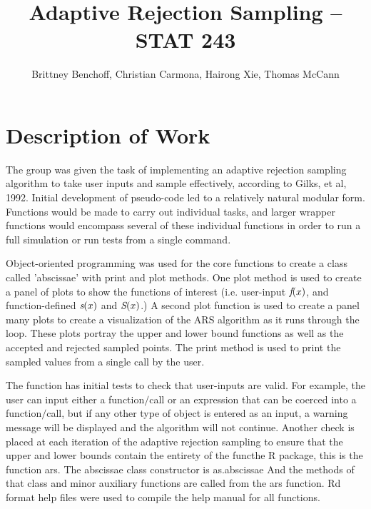 \documentclass{article}\usepackage[]{graphicx}\usepackage[]{color}
\begin{document}
\pagestyle{fancy}



\title{Adaptive Rejection Sampling -- STAT 243}
\author{Brittney Benchoff, Christian Carmona, Hairong Xie, Thomas McCann}
\maketitle


\section{Description of Work}


The group was given the task of implementing an adaptive rejection sampling algorithm to take user inputs and sample effectively, according to Gilks, et al, 1992.  Initial development of pseudo-code led to a relatively natural modular form.  Functions would be made to carry out individual tasks, and larger wrapper functions would encompass several of these individual functions in order to run a full simulation or run tests from a single command. 

Object-oriented programming was used for the core functions to create a class called 'abscissae' with print and plot methods.  One plot method is used to create a panel of plots to show the functions of interest (i.e. user-input $\emph{f}(x)$, and function-defined $\emph{s}(x)$ and $\emph{S}(x)$.)  A second plot function is used to create a panel many plots to create a visualization of the ARS algorithm as it runs through the loop.  These plots portray the upper and lower bound functions as well as the accepted and rejected sampled points.  The print method is used to print the sampled values from a single call by the user.

The function has initial tests to check that user-inputs are valid.  For example, the user can input either a function$/$call or an expression that can be coerced into a function$/$call, but if any other type of object is entered as an input, a warning message will be displayed and the algorithm will not continue.  Another check is placed at each iteration of the adaptive rejection sampling to ensure that the upper and lower bounds contain the entirety of the functhe R package, this is the function ars.  The abscissae class constructor is as.abscissae  And the methods of that class and minor auxiliary functions are called from the ars function.  Rd format help files were used to compile the help manual for all functions.
\end{document}
